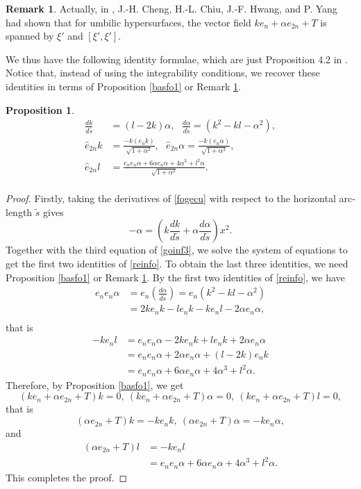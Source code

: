 \documentclass[12pt]{amsart}
\newtheorem{prop}[thm]{\sc Proposition}
\theoremstyle{definition}\newtheorem{exa}[thm]{\sc Example}
\theoremstyle{definition}\newtheorem{de}[thm]{\sc Definition}
\theoremstyle{definition}\newtheorem{rem}[thm]{\sc Remark}
\theoremstyle{definition}\newtheorem{prob}[thm]{\it Problem}
\theoremstyle{definition}\newtheorem{fact}[thm]{\sc Fact}
\theoremstyle{definition}\newtheorem{claim}[thm]{\sc Claim}
\numberwithin{equation}{section}
\begin{document}
\begin{rem}\label{basfo}
Actually, in \cite{CCHY1,CCHY2}, J.-H. Cheng, H.-L. Chiu, J.-F. Hwang, and P. Yang had shown that for umbilic hypersurfaces, the vector field $k e_{n}+\alpha e_{2n}+T$ is spanned by $\xi'$ and $[\xi',\xi']$.
\end{rem}
We thus have the following identity formulae, which are just Proposition 4.2 in \cite{CCHY1}. Notice that, instead of using the integrability conditions, we recover these identities in terms of Proposition \ref{basfo1} or Remark \ref{basfo}.
\begin{prop}
\begin{equation}\label{reinfo}
\begin{split} 
\frac{dk}{d\tilde{s}}&=(l-2k)\alpha,\ \ \ \frac{d\alpha}{d\tilde{s}}=(k^2-kl-\alpha^2),\\
\hat{e}_{2n}k&=\frac{-k(e_{n}k)}{\sqrt{1+\alpha^2}},\ \ \ \hat{e}_{2n}\alpha=\frac{-k(e_{n}\alpha)}{\sqrt{1+\alpha^2}},\\
\hat{e}_{2n}l&=\frac{e_{n}e_{n}\alpha+6\alpha e_{n}\alpha+4\alpha^3+l^{2}\alpha}{\sqrt{1+\alpha^2}}.\\
\end{split}
\end{equation}
\end{prop}
\begin{proof}
Firstly, taking the derivatives of \eqref{fogecu} with respect to the horizontal arc-length $\tilde{s}$ gives
\[-\alpha=\left(k\frac{dk}{d\tilde{s}}+\alpha\frac{d\alpha}{d\tilde{s}}\right)x^2.\]
Together with the third equation of \eqref{goinf3}, we solve the system of equations to get the first two identities of \eqref{reinfo}.
To obtain the last three identities, we need Proposition \ref{basfo1} or Remark \ref{basfo}. By the first two identities of \eqref{reinfo}, we have
\[\begin{split}
e_{n}e_{n}\alpha&=e_{n}\left(\frac{d\alpha}{d\tilde{s}}\right)=e_{n}(k^2-kl-\alpha^2)\\
&=2ke_{n}k-le_{n}k-ke_{n}l-2\alpha e_{n}\alpha,\\
\end{split}\]
that is
\[\begin{split}
-ke_{n}l&=e_{n}e_{n}\alpha-2ke_{n}k+le_{n}k+2\alpha e_{n}\alpha\\
&=e_{n}e_{n}\alpha+2\alpha e_{n}\alpha+(l-2k)e_{n}k\\
&=e_{n}e_{n}\alpha+6\alpha e_{n}\alpha+4\alpha^3+l^{2}\alpha.
\end{split}\]
Therefore, by Proposition \ref{basfo1}, we get
\[(k e_{n}+\alpha e_{2n}+T)k=0,\ (k e_{n}+\alpha e_{2n}+T)\alpha=0,\ (k e_{n}+\alpha e_{2n}+T)l=0,\]
that is
\[(\alpha e_{2n}+T)k=-k e_{n}k,\ (\alpha e_{2n}+T)\alpha=-k e_{n}\alpha,\]
and
\[\begin{split}
(\alpha e_{2n}+T)l&=-k e_{n}l\\
&=e_{n}e_{n}\alpha+6\alpha e_{n}\alpha+4\alpha^3+l^{2}\alpha.
\end{split}\]
This completes the proof.
\end{proof}
\end{document}

